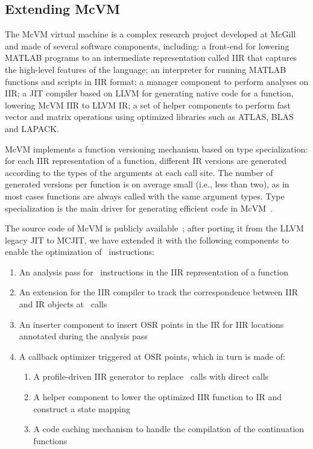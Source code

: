 \subsection{Extending McVM}
The McVM virtual machine is a complex research project developed at McGill~\cite{mcvm} and made of several software components, including: a front-end for lowering MATLAB programs to an intermediate representation called IIR that captures the high-level features of the language; an interpreter for running MATLAB functions and scripts in IIR format; a manager component to perform analyses on IIR; a JIT compiler based on LLVM for generating native code for a function, lowering McVM IIR to LLVM IR; a set of helper components to perform fast vector and matrix operations using optimized libraries such as ATLAS, BLAS and LAPACK. %

McVM implements a function versioning mechanism based on type specialization: for each IIR representation of a function, different IR versions are generated according to the types of the arguments at each call site. The number of generated versions per function is on average small (i.e., less than two), as in most cases functions are always called with the same argument types. Type specialization is the main driver for generating efficient code in McVM~\cite{chevalier2010mcvm}.

The source code of McVM is publicly available~\cite{mcvm}; after porting it from the LLVM legacy JIT to MCJIT, we have extended it with the following components to enable the optimization of \feval\ instructions:
\begin{enumerate}
\item An analysis pass for \feval\ instructions in the IIR representation of a function
\item An extension for the IIR compiler to track the correspondence between IIR and IR objects at \feval\ calls
\item An inserter component to insert OSR points in the IR for IIR locations annotated during the analysis pass
\item A callback optimizer triggered at OSR points, which in turn is made of:
\begin{enumerate}
\item A profile-driven IIR generator to replace \feval\ calls with direct calls
\item A helper component to lower the optimized IIR function to IR and construct a state mapping 
\item A code caching mechanism to handle the compilation of the continuation functions
\end{enumerate}
\end{enumerate}

